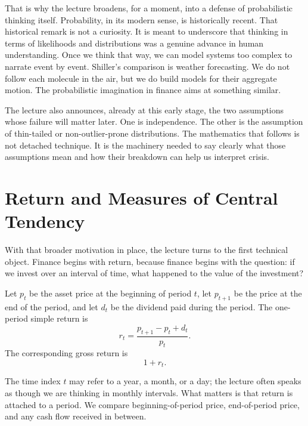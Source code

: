 That is why the lecture broadens, for a moment, into a defense of probabilistic thinking itself. Probability, in its modern sense, is historically recent. That historical remark is not a curiosity. It is meant to underscore that thinking in terms of likelihoods and distributions was a genuine advance in human understanding. Once we think that way, we can model systems too complex to narrate event by event. Shiller's comparison is weather forecasting. We do not follow each molecule in the air, but we do build models for their aggregate motion. The probabilistic imagination in finance aims at something similar.

The lecture also announces, already at this early stage, the two assumptions whose failure will matter later. One is independence. The other is the assumption of thin-tailed or non-outlier-prone distributions. The mathematics that follows is not detached technique. It is the machinery needed to say clearly what those assumptions mean and how their breakdown can help us interpret crisis.

\section{Return and Measures of Central Tendency}

With that broader motivation in place, the lecture turns to the first technical object. Finance begins with return, because finance begins with the question: if we invest over an interval of time, what happened to the value of the investment?

\begin{definition}
Let \(p_t\) be the asset price at the beginning of period \(t\), let \(p_{t+1}\) be the price at the end of the period, and let \(d_t\) be the dividend paid during the period. The one-period simple return is
\begin{equation}
r_t=\frac{p_{t+1}-p_t+d_t}{p_t}.
\end{equation}
The corresponding gross return is
\begin{equation}
1+r_t.
\end{equation}
\end{definition}

The time index \(t\) may refer to a year, a month, or a day; the lecture often speaks as though we are thinking in monthly intervals. What matters is that return is attached to a period. We compare beginning-of-period price, end-of-period price, and any cash flow received in between.

